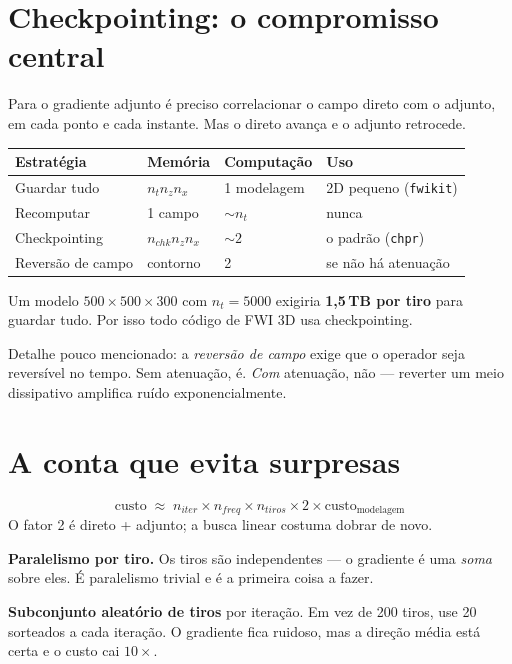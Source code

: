 \documentclass[11pt,a4paper,oneside]{report}
\newcommand{\arq}[1]{\texttt{\small #1}}
\begin{document}
\section{Checkpointing: o compromisso central}

Para o gradiente adjunto é preciso correlacionar o campo direto com o
adjunto, em cada ponto e cada instante. Mas o direto avança e o adjunto
retrocede.

\begin{center}
\begin{tabular}{@{}llll@{}}
\toprule
\textbf{Estratégia} & \textbf{Memória} & \textbf{Computação} & \textbf{Uso} \\
\midrule
Guardar tudo    & $n_t n_z n_x$    & 1 modelagem   & 2D pequeno (\arq{fwikit}) \\
Recomputar      & 1 campo          & $\sim n_t$    & nunca \\
Checkpointing   & $n_{chk} n_z n_x$& $\sim 2$      & o padrão (\texttt{chpr}) \\
Reversão de campo & contorno       & 2             & se não há atenuação \\
\bottomrule
\end{tabular}
\end{center}

\begin{atencao}
Um modelo $500\times500\times300$ com $n_t = 5000$ exigiria \textbf{1{,}5\,TB
por tiro} para guardar tudo. Por isso todo código de FWI 3D usa
checkpointing.

Detalhe pouco mencionado: a \emph{reversão de campo} exige que o operador seja
reversível no tempo. Sem atenuação, é. \emph{Com} atenuação, não --- reverter
um meio dissipativo amplifica ruído exponencialmente.
\end{atencao}

\section{A conta que evita surpresas}
\begin{equation}
\text{custo} \;\approx\; n_{iter} \times n_{freq} \times n_{tiros}
\times 2 \times \text{custo}_{\text{modelagem}}
\end{equation}
O fator 2 é direto + adjunto; a busca linear costuma dobrar de novo.

\begin{pratica}
\textbf{Paralelismo por tiro.} Os tiros são independentes --- o gradiente é
uma \emph{soma} sobre eles. É paralelismo trivial e é a primeira coisa a
fazer.

\textbf{Subconjunto aleatório de tiros} por iteração. Em vez de 200 tiros, use
20 sorteados a cada iteração. O gradiente fica ruidoso, mas a direção média
está certa e o custo cai $10\times$.
\end{pratica}
\end{document}
